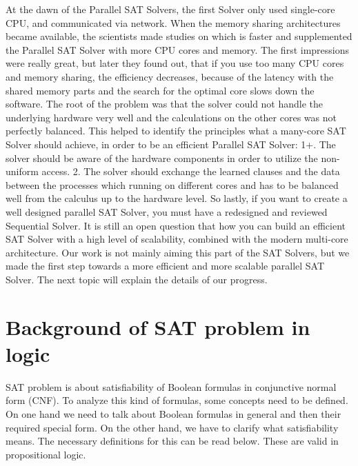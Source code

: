 \documentclass{article}
\begin{document}
At the dawn of the Parallel SAT Solvers, the first Solver only used single-core CPU, and communicated via network. When the memory sharing architectures became available, the scientists made studies on which is faster and supplemented the Parallel SAT Solver with more CPU cores and memory. The first impressions were really great, but later they found out, that if you use too many CPU cores and memory sharing, the efficiency decreases, because of the latency with the shared memory parts and the search for the optimal core slows down the software. The root of the problem was that the solver could not handle the underlying hardware very well and the calculations on the other cores was not perfectly balanced. This helped to identify the principles what a many-core SAT Solver should achieve, in order to be an efficient Parallel SAT Solver:
1+. The solver should be aware of the hardware components in order to utilize the non-uniform access.
2. The solver should exchange the learned clauses and the data between the processes which running on different cores and has to be balanced well from the calculus up to the hardware level.
So lastly, if you want to create a well designed parallel SAT Solver, you must have a redesigned and reviewed Sequential Solver. It is still an open question that how you can build an efficient SAT Solver with a high level of scalability, combined with the modern multi-core architecture.
Our work is not mainly aiming this part of the SAT Solvers, but we made the first step towards a more efficient and more scalable parallel SAT Solver. The next topic will explain the details of our progress.\cite{OverviewSAT}

\section{Background of SAT problem in logic}
\label{sec:background}

SAT problem is about satisfiability of Boolean formulas in conjunctive normal form (CNF). To analyze this kind of formulas, some concepts need to be defined. On one hand we need to talk about Boolean formulas in general and then their required special form. On the other hand, we have to clarify what satisfiability means. The necessary definitions for this can be read below. These are valid in propositional logic.
\end{document}
